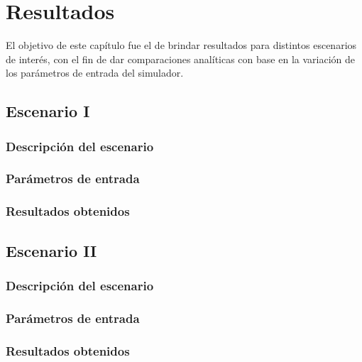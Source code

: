 
\chapter{Resultados} %

\label{Chapter7} %

El objetivo de este capítulo fue el de brindar resultados para distintos escenarios de interés, con el fin de dar comparaciones analíticas con base en la variación de los parámetros de entrada del simulador.


\section{Escenario I} %
\subsection{Descripción del escenario}
\subsection{Parámetros de entrada}
\subsection{Resultados obtenidos}


\section{Escenario II} %
\subsection{Descripción del escenario}
\subsection{Parámetros de entrada}
\subsection{Resultados obtenidos}

